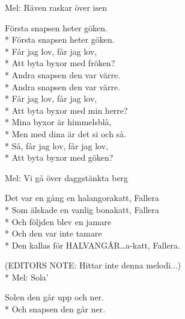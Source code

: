 \begin{SongText}
\begin{SongInfo}
    Mel: Räven raskar över isen
\end{SongInfo}
\begin{SongVerse}
    Första snapsen heter göken.\\*%
    Första snapsen heter göken.\\*%
    Får jag lov, får jag lov,\\*%
    Att byta byxor med fröken?\\*%
    Andra snapsen den var värre.\\*%
    Andra snapsen den var värre.\\*%
    Får jag lov, får jag lov,\\*%
    Att byta byxor med min herre?\\*%
    Mina byxor är himmelsblå,\\*%
    Men med dina är det si och så.\\*%
    Så, får jag lov, får jag lov,\\*%
    Att byta byxor med göken?
\end{SongVerse}
\end{SongText}
\begin{SongText}[Helangorakatt]
\begin{SongInfo}
    Mel: Vi gå över daggstänkta berg
\end{SongInfo}
\begin{SongVerse}
    Det var en gång en halangorakatt, Fallera\\*%
    Som älskade en vanlig bonakatt, Fallera\\*%
    Och följden blev en jamare\\*%
    Och den var inte tamare\\*%
    Den kallas för HALVANGÅR…a-katt, Fallera.
\end{SongVerse}
\end{SongText}
\begin{SongText}
\begin{SongInfo}
    (EDITORS NOTE: Hittar inte denna melodi...)\\*%
    Mel: Sola’
\end{SongInfo}
\begin{SongVerse}
    Solen den går upp och ner.\\*%
    Och snapsen den går ner.
\end{SongVerse}
\end{SongText}
